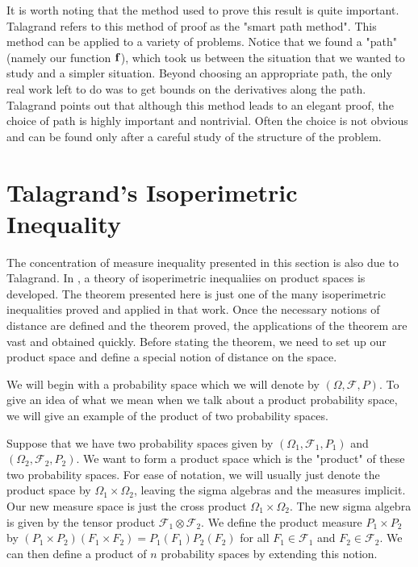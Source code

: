 \documentclass[12pt]{report}
\theoremstyle{definition}
\begin{document}
It is worth noting that the method used to prove this result is quite important.  Talagrand \cite{Talagrandbook} refers to this method of proof as the "smart path method".  This method can be applied to a variety of problems.  Notice that we found a "path" (namely our function ${\bf f}$), which took us between the situation that we wanted to study and a simpler situation.  Beyond choosing an appropriate path, the only real work left to do was to get bounds on the derivatives along the path.  Talagrand points out that although this method leads to an elegant proof, the choice of path is highly important and nontrivial.  Often the choice is not obvious and can be found only after a careful study of the structure of the problem.
  
\section{Talagrand's Isoperimetric Inequality}
The concentration of measure inequality presented in this section is also due to Talagrand.  In \cite{Talagrand}, a theory of isoperimetric inequaliies on product spaces is developed.  The theorem presented here is just one of the many isoperimetric inequalities proved and applied in that work.  Once the necessary notions of distance are defined and the theorem proved, the applications of the theorem are vast and obtained quickly.  Before stating the theorem, we need to set up our product space and define a special notion of distance on the space.  

We will begin with a probability space which we will denote by $(\Omega, \mathcal{F}, P)$.  To give an idea of what we mean when we talk about a product probability space, we will give an example of the product of two probability spaces.  

Suppose that we have two probability spaces given by $(\Omega_1,\mathcal{F}_1, P_1)$ and $(\Omega_2, \mathcal{F}_2, P_2)$.  We want to form a product space which is the "product" of these two probability spaces.  For ease of notation, we will usually just denote the product space by $\Omega_1\times \Omega_2$, leaving the sigma algebras and the measures implicit.  Our new measure space is just the cross product $\Omega_1\times\Omega_2$.  The new sigma algebra is given by the tensor product $\mathcal{F}_1\otimes \mathcal{F}_2$.  We define the product measure $P_1\times P_2$ by $(P_1\times P_2)(F_1\times F_2)=P_1(F_1)P_2(F_2)$ for all $F_1\in\mathcal{F}_1$ and $F_2\in \mathcal{F}_2$.  We can then define a product of $n$ probability spaces by extending this notion.  
\end{document}
